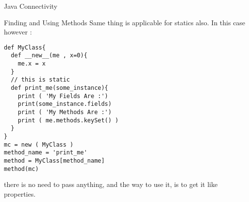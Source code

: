 \begin{section}{Java Connectivity}
\begin{subsection}{Finding and Using Methods}
Same thing is applicable for statics also.
In this case however :

\begin{center}\begin{minipage}{\linewidth}
\begin{lstlisting}[style=JexlStyle]
def MyClass{
  def __new__(me , x=0){
    me.x = x 
  }
  // this is static 
  def print_me(some_instance){
    print ( 'My Fields Are :')
    print(some_instance.fields)
    print ( 'My Methods Are :')
    print ( me.methods.keySet() )
  }
}
mc = new ( MyClass )
method_name = 'print_me'
method = MyClass[method_name]
method(mc)
\end{lstlisting}  
\end{minipage}\end{center}
there is no need to pass anything, 
and the way to use it, is to get it like properties.

\end{subsection}

\end{section}
